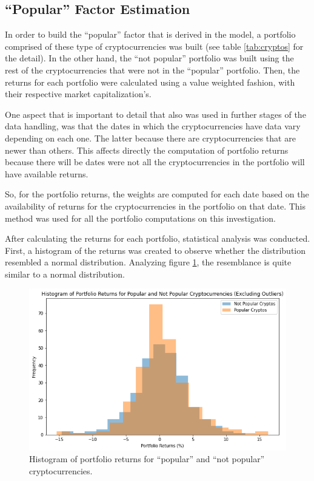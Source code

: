 \subsection{``Popular'' Factor Estimation}
In order to build the ``popular'' factor that is derived in the model, a portfolio comprised of these type of cryptocurrencies was built (see table \ref{tab:cryptos} for the detail). In the other hand, the ``not popular'' portfolio was built using the rest of the cryptocurrencies that were not in the ``popular'' portfolio. Then, the returns for each portfolio were calculated using a value weighted fashion, with their respective market capitalization's.

One aspect that is important to detail that also was used in further stages of the data handling, was that the dates in which the cryptocurrencies have data vary depending on each one. The latter because there are cryptocurrencies that are newer than others. This affects directly the computation of portfolio returns because there will be dates were not all the cryptocurrencies in the portfolio will have available returns.

So, for the portfolio returns, the weights are computed for each date based on the availability of returns for the cryptocurrencies in the portfolio on that date. This method was used for all the portfolio computations on this investigation.

After calculating the returns for each portfolio, statistical analysis was conducted. First, a histogram of the returns was created to observe whether the distribution resembled a normal distribution. Analyzing figure \ref{fig:histogram-of-portfolio-returns}, the resemblance is quite similar to a normal distribution.
\begin{figure}[h!]
	\centering
	\includegraphics[width=0.95\linewidth]{"Histogram of portfolio returns"}
	\caption{Histogram of portfolio returns for ``popular'' and ``not popular'' cryptocurrencies.}
	\label{fig:histogram-of-portfolio-returns}
\end{figure}

